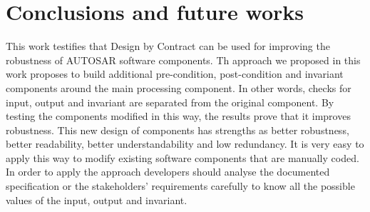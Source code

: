 \section{Conclusions and future works}\label{sec:conclusions}

This work testifies that Design by Contract can be used for improving the robustness of AUTOSAR software components. %
Th approach we proposed in this work %
proposes to build additional pre-condition, post-condition and invariant components around the main processing component. In other words, checks for input, output and invariant are separated from the original component. By testing the components modified in this way, the results prove that it improves robustness. This new design of components has strengths as better robustness, better readability, better understandability and low redundancy. It is very easy to apply this way to modify existing software components that are manually coded. %
In order to apply the approach developers should analyse the documented specification or the stakeholders' requirements carefully to know all the possible values of the input, output and invariant. %



